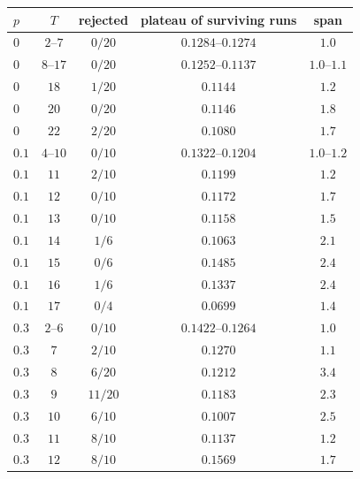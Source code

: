 \begin{table}[!htb]
  \centering
  \begin{tabular}{lcccc}
    \hline
    $p$   & $T$       & rejected & plateau of surviving runs & span         \\
    \hline
    $0$   & $2$--$7$  & $0/20$   & $0.1284$--$0.1274$        & $1.0$        \\
    $0$   & $8$--$17$ & $0/20$   & $0.1252$--$0.1137$        & $1.0$--$1.1$ \\
    $0$   & $18$      & $1/20$   & $0.1144$                  & $1.2$        \\
    $0$   & $20$      & $0/20$   & $0.1146$                  & $1.8$        \\
    $0$   & $22$      & $2/20$   & $0.1080$                  & $1.7$        \\
    $0.1$ & $4$--$10$ & $0/10$   & $0.1322$--$0.1204$        & $1.0$--$1.2$ \\
    $0.1$ & $11$      & $2/10$   & $0.1199$                  & $1.2$        \\
    $0.1$ & $12$      & $0/10$   & $0.1172$                  & $1.7$        \\
    $0.1$ & $13$      & $0/10$   & $0.1158$                  & $1.5$        \\
    $0.1$ & $14$      & $1/6$    & $0.1063$                  & $2.1$        \\
    $0.1$ & $15$      & $0/6$    & $0.1485$                  & $2.4$        \\
    $0.1$ & $16$      & $1/6$    & $0.1337$                  & $2.4$        \\
    $0.1$ & $17$      & $0/4$    & $0.0699$                  & $1.4$        \\
    $0.3$ & $2$--$6$  & $0/10$   & $0.1422$--$0.1264$        & $1.0$        \\
    $0.3$ & $7$       & $2/10$   & $0.1270$                  & $1.1$        \\
    $0.3$ & $8$       & $6/20$   & $0.1212$                  & $3.4$        \\
    $0.3$ & $9$       & $11/20$  & $0.1183$                  & $2.3$        \\
    $0.3$ & $10$      & $6/10$   & $0.1007$                  & $2.5$        \\
    $0.3$ & $11$      & $8/10$   & $0.1137$                  & $1.2$        \\
    $0.3$ & $12$      & $8/10$   & $0.1569$                  & $1.7$        \\

\end{tabular}
\end{table}

